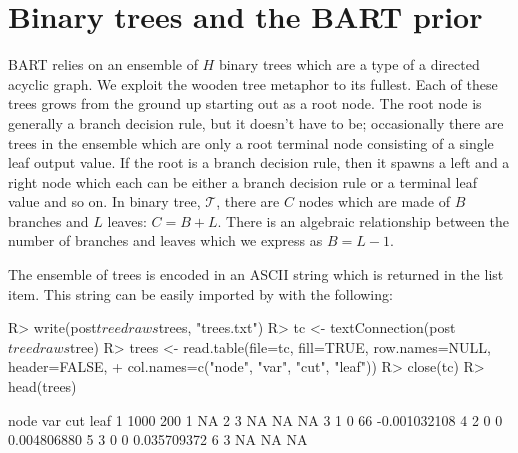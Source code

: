 \documentclass[article]{jss}
\begin{document}
\section{Binary trees and the BART prior}\label{trees}

BART relies on an ensemble of $H$ binary trees which are a type of a
directed acyclic graph.  We exploit the wooden tree metaphor to its
fullest.  Each of these trees grows from the ground up starting out as
a root node.  The root node is generally a branch decision rule, but
it doesn't have to be; occasionally there are trees in the ensemble
which are only a root terminal node consisting of a single leaf output
value.  If the root is a branch decision rule, then it spawns a left
and a right node which each can be either a branch decision rule or a
terminal leaf value and so on.  In binary tree, $\mathcal{T}$, there
are $C$ nodes which are made of $B$ branches and $L$ leaves: $C=B+L$.
There is an algebraic relationship between the number of branches and
leaves which we express as $B= L-1$.

The ensemble of trees is encoded in an ASCII string
which is returned in the  list item.  This
string can be easily %
imported by  with the following:\\
\begin{Sinput}
R> write(post$treedraws$trees, "trees.txt")
R> tc <- textConnection(post$treedraws$tree)
R> trees <- read.table(file=tc, fill=TRUE, row.names=NULL, header=FALSE,
+    col.names=c("node", "var", "cut", "leaf"))
R> close(tc)
R> head(trees)
\end{Sinput}
\begin{minipage}{9cm}
\begin{Soutput}
  node var cut         leaf
1 1000 200   1           NA
2    3  NA  NA           NA
3    1   0  66 -0.001032108
4    2   0   0  0.004806880
5    3   0   0  0.035709372
6    3  NA  NA           NA
\end{Soutput}
\end{minipage}
\begin{minipage}{4cm}
\usetikzlibrary{shadows}
\end{minipage}
\end{document}
